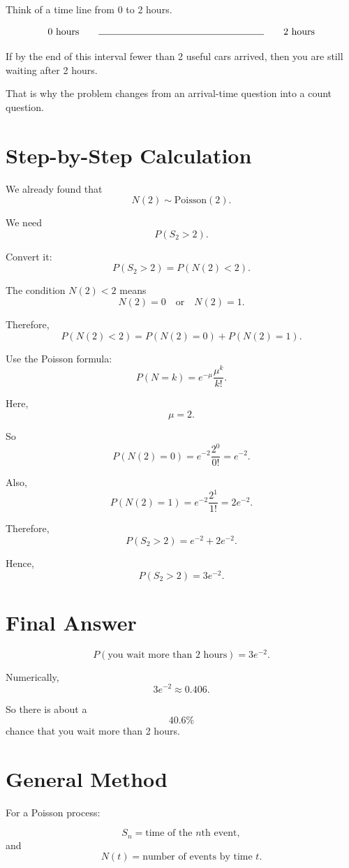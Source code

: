 \documentclass[12pt]{article}
\begin{document}
Think of a time line from 0 to 2 hours.

\[
\text{0 hours} \qquad \rule{6cm}{0.4pt} \qquad \text{2 hours}
\]

If by the end of this interval fewer than 2 useful cars arrived, then you are still
waiting after 2 hours.

That is why the problem changes from an arrival-time question into a count question.

\section*{Step-by-Step Calculation}

We already found that
\[
N(2)\sim \text{Poisson}(2).
\]

We need
\[
P(S_2>2).
\]

Convert it:
\[
P(S_2>2)=P(N(2)<2).
\]

The condition \(N(2)<2\) means
\[
N(2)=0 \quad \text{or} \quad N(2)=1.
\]

Therefore,
\[
P(N(2)<2)
=
P(N(2)=0)+P(N(2)=1).
\]

Use the Poisson formula:
\[
P(N=k)=e^{-\mu}\frac{\mu^k}{k!}.
\]

Here,
\[
\mu=2.
\]

So
\[
P(N(2)=0)
=
e^{-2}\frac{2^0}{0!}
=
e^{-2}.
\]

Also,
\[
P(N(2)=1)
=
e^{-2}\frac{2^1}{1!}
=
2e^{-2}.
\]

Therefore,
\[
P(S_2>2)
=
e^{-2}+2e^{-2}.
\]

Hence,
\[
\boxed{P(S_2>2)=3e^{-2}.}
\]

\section*{Final Answer}

\[
\boxed{P(\text{you wait more than 2 hours})=3e^{-2}.}
\]

Numerically,
\[
3e^{-2}\approx 0.406.
\]

So there is about a
\[
\boxed{40.6\%}
\]
chance that you wait more than 2 hours.

\section*{General Method}

For a Poisson process:

\[
S_n = \text{time of the }n\text{th event},
\]
and
\[
N(t)=\text{number of events by time }t.
\]
\end{document}
